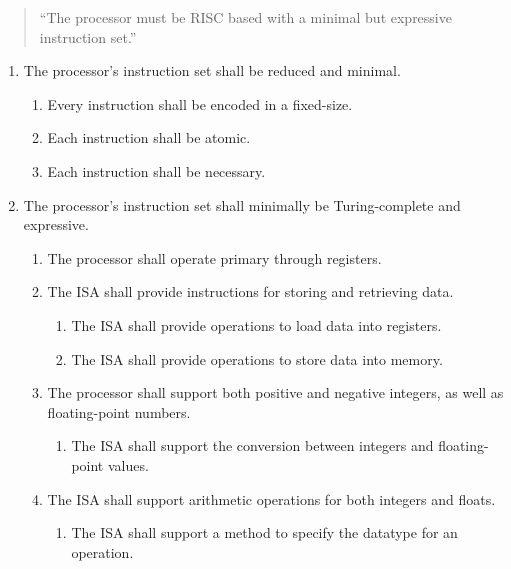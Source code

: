 \documentclass{article}
\begin{document}
\begin{quote}
    ``The processor must be RISC based with a minimal but expressive instruction set.''
\end{quote}

\begin{enumerate}[label=R\arabic*]
    \item The processor's instruction set shall be reduced and minimal.
    \begin{enumerate}[label=\theenumi.\arabic*]
        \item Every instruction shall be encoded in a fixed-size.
        \item Each instruction shall be atomic.
        \item Each instruction shall be necessary.
    \end{enumerate}
    \item The processor's instruction set shall minimally be Turing-complete and expressive.
    \begin{enumerate}[label=\theenumi.\arabic*]
        \item The processor shall operate primary through registers.
        \item The ISA shall provide instructions for storing and retrieving data.
        \begin{enumerate}[label=\theenumii.\arabic*]
            \item The ISA shall provide operations to load data into registers.
            \item The ISA shall provide operations to store data into memory.
        \end{enumerate}
        \item The processor shall support both positive and negative integers, as well as floating-point numbers.
        \begin{enumerate}[label=\theenumii.\arabic*]
            \item The ISA shall support the conversion between integers and floating-point values.
        \end{enumerate}
        \item The ISA shall support arithmetic operations for both integers and floats.
        \begin{enumerate}[label=\theenumii.\arabic*]
            \item The ISA shall support a method to specify the datatype for an operation.
            \begin{enumerate}[label=\theenumiii.\arabic*]

\end{enumerate}
\end{enumerate}
\end{enumerate}
\end{enumerate}
\end{document}
